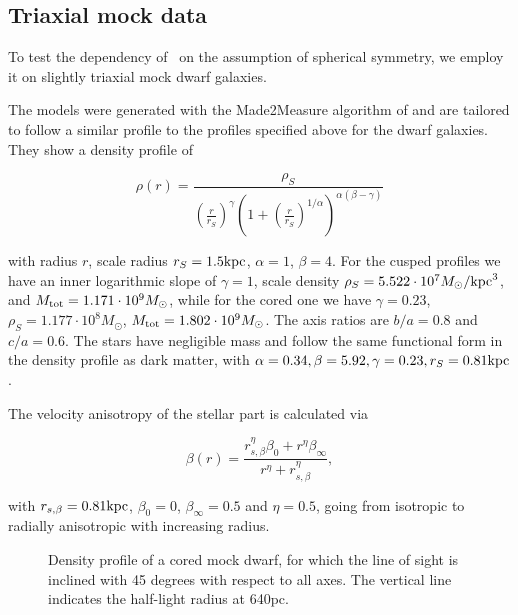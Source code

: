 \subsection{Triaxial mock data}

To test the dependency of \GravImage\ on the assumption of spherical
symmetry, we employ it on slightly triaxial mock dwarf galaxies.

The models were generated with the Made2Measure algorithm of
\cite{Dehnen2009} and are tailored to follow a similar profile to the
profiles specified above for the dwarf galaxies. They show a density
profile of

\begin{equation}
    \rho(r)=\frac{\rho_S}{\left(\frac{r}{r_S}\right)^\gamma\left(1+\left(\frac{r}{r_S}\right)^{1/\alpha}\right)^{\alpha(\beta-\gamma)}}
\end{equation}

with radius $r$, scale radius $r_S=1.5\mathrm{kpc}$, $\alpha=1$,
$\beta=4$. For the cusped profiles we have an inner logarithmic slope
of $\gamma=1$, scale density $\rho_S=5.522\cdot 10^7M_\odot/\mathrm{kpc}^3$,
and $M_{\mathrm{tot}}=1.171\cdot10^9M_\odot$, while for the cored one we have
$\gamma=0.23$, $\rho_S=1.177\cdot10^8M_\odot$,
$M_{\mathrm{tot}}=1.802\cdot10^9M_\odot$. The axis ratios are $b/a=0.8$ and
$c/a=0.6$. The stars have negligible mass and follow the same
functional form in the density profile as dark matter, with
$\alpha=0.34, \beta=5.92, \gamma=0.23, r_S=0.81\mathrm{kpc}$.

The velocity anisotropy of the stellar part is calculated via

\begin{equation}
    \beta(r)=\frac{r_{s,\beta}^\eta \beta_0+r^\eta \beta_\infty}{r^\eta+r_{s,\beta}^\eta},
\end{equation}

with $r_{s,\beta}=0.81\mathrm{kpc}$, $\beta_0=0$, $\beta_\infty=0.5$ and
$\eta=0.5$, going from isotropic to radially anisotropic with
increasing radius.

\begin{figure*}
    \begin{center}
        \hspace{-7mm}
        \caption{Density profile of a cored  mock
          dwarf, for which the line of sight is inclined with 45
          degrees with respect to all axes. The vertical line
          indicates the half-light radius at 640pc.}
        \label{fig:triax}
    \end{center}
\end{figure*}


